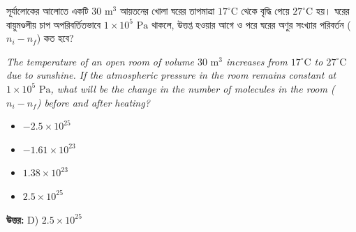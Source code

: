 \documentclass[12pt, a4paper]{article}
\begin{document}
\begin{tcolorbox}[questionbox={প্রশ্ন (Question) 4}]
    \noindent
    সূর্যালোকের আলোতে একটি $30\text{ m}^3$ আয়তনের খোলা ঘরের তাপমাত্রা $17^\circ\text{C}$ থেকে বৃদ্ধি পেয়ে $27^\circ\text{C}$ হয়। ঘরের বায়ুমণ্ডলীয় চাপ অপরিবর্তিতভাবে $1 \times 10^5\text{ Pa}$ থাকলে, উত্তপ্ত হওয়ার আগে ও পরে ঘরের অণুর সংখ্যার পরিবর্তন ($n_i - n_f$) কত হবে?
    
    \vspace{0.8em}
    \begin{english}
    \noindent\textit{\color{darkgray}
    The temperature of an open room of volume $30\text{ m}^3$ increases from $17^\circ\text{C}$ to $27^\circ\text{C}$ due to sunshine. If the atmospheric pressure in the room remains constant at $1 \times 10^5\text{ Pa}$, what will be the change in the number of molecules in the room ($n_i - n_f$) before and after heating?
    }
    \end{english}
\end{tcolorbox}

\begin{itemize}[label={}, leftmargin=1cm, itemsep=0.5em]
    \item[\textbf{A)}] $-2.5 \times 10^{25}$
    \item[\textbf{B)}] $-1.61 \times 10^{23}$
    \item[\textbf{C)}] $1.38 \times 10^{23}$
    \item[\textbf{D)}] $2.5 \times 10^{25}$
\end{itemize}

\vspace{0.5em}
\begin{tcolorbox}[answerbox]
    \textbf{\color{success} উত্তর:} D) $2.5 \times 10^{25}$
\end{tcolorbox}
\vspace{1em}
\end{document}
